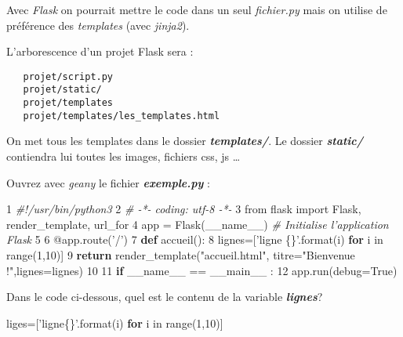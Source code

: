 \documentclass{article}
\newenvironment{Shaded}{}{}
\newcommand{\KeywordTok}[1]{\textcolor[rgb]{0.00,0.44,0.13}{\textbf{{#1}}}}
\newcommand{\DataTypeTok}[1]{\textcolor[rgb]{0.56,0.13,0.00}{{#1}}}
\newcommand{\DecValTok}[1]{\textcolor[rgb]{0.25,0.63,0.44}{{#1}}}
\newcommand{\CharTok}[1]{\textcolor[rgb]{0.25,0.44,0.63}{{#1}}}
\newcommand{\StringTok}[1]{\textcolor[rgb]{0.25,0.44,0.63}{{#1}}}
\newcommand{\CommentTok}[1]{\textcolor[rgb]{0.38,0.63,0.69}{\textit{{#1}}}}
\newcommand{\OtherTok}[1]{\textcolor[rgb]{0.00,0.44,0.13}{{#1}}}
\newcommand{\NormalTok}[1]{{#1}}
\begin{document}
Avec \emph{Flask} on pourrait mettre le code dans un seul
\emph{fichier.py} mais on utilise de préférence des \emph{templates}
(avec \emph{jinja2}).

L'arborescence d'un projet Flask sera :

\begin{verbatim}
   projet/script.py
   projet/static/
   projet/templates
   projet/templates/les_templates.html
\end{verbatim}

On met tous les templates dans le dossier \textbf{\emph{templates/}}. Le
dossier \textbf{\emph{static/}} contiendra lui toutes les images,
fichiers css, js \ldots{}

Ouvrez avec \emph{geany} le fichier \textbf{\emph{exemple.py}} :

\begin{Shaded}
\begin{Highlighting}[]
 \DecValTok{1} \CommentTok{#!/usr/bin/python3}
 \DecValTok{2} \CommentTok{# -*- coding: utf-8 -*-}
 \DecValTok{3} \CharTok{from} \NormalTok{flask }\CharTok{import} \NormalTok{Flask, render_template, url_for}
 \DecValTok{4} \NormalTok{app = Flask(}\OtherTok{__name__}\NormalTok{)   }\CommentTok{# Initialise l'application Flask}
 \DecValTok{5}
 \DecValTok{6} \NormalTok{@app.route(}\StringTok{'/'}\NormalTok{)}
 \DecValTok{7} \KeywordTok{def} \NormalTok{accueil():}
 \DecValTok{8}     \NormalTok{lignes=[}\StringTok{'ligne \{\}'}\NormalTok{.}\DataTypeTok{format}\NormalTok{(i) }\KeywordTok{for} \NormalTok{i in }\DataTypeTok{range}\NormalTok{(}\DecValTok{1}\NormalTok{,}\DecValTok{10}\NormalTok{)]}
 \DecValTok{9}     \KeywordTok{return} \NormalTok{render_template(}\StringTok{"accueil.html"}\NormalTok{, titre=}\StringTok{"Bienvenue !"}\NormalTok{,lignes=lignes)}
\DecValTok{10}
\DecValTok{11} \KeywordTok{if} \OtherTok{__name__} \NormalTok{== __main__ :}
\DecValTok{12}     \NormalTok{app.run(debug=}\OtherTok{True}\NormalTok{)}
\end{Highlighting}
\end{Shaded}

Dans le code ci-dessous, quel est le contenu de la variable
\textbf{\emph{lignes}}?

\begin{Shaded}
\begin{Highlighting}[]
 \NormalTok{liges=[}\StringTok{'ligne\{\}'}\NormalTok{.}\DataTypeTok{format}\NormalTok{(i) }\KeywordTok{for} \NormalTok{i in }\DataTypeTok{range}\NormalTok{(}\DecValTok{1}\NormalTok{,}\DecValTok{10}\NormalTok{)]}
\end{Highlighting}
\end{Shaded}
\end{document}
